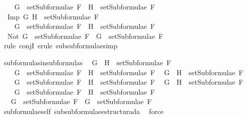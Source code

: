 \begin{isabellebody}
\ \ \ {\isasymLongrightarrow}\ G\ {\isasymin}\ setSubformulae\ F\ {\isasymand}\ H\ {\isasymin}\ setSubformulae\ F{\isachardoublequoteclose}\isanewline
\ \ {\isachardoublequoteopen}Imp\ G\ H\ {\isasymin}\ setSubformulae\ F\ \isanewline
\ \ \ {\isasymLongrightarrow}\ G\ {\isasymin}\ setSubformulae\ F\ {\isasymand}\ H\ {\isasymin}\ setSubformulae\ F{\isachardoublequoteclose}\isanewline
\ \ {\isachardoublequoteopen}Not\ G\ {\isasymin}\ setSubformulae\ F\ {\isasymLongrightarrow}\ G\ {\isasymin}\ setSubformulae\ F{\isachardoublequoteclose}\isanewline
%
\isadelimproof
\ \ %
\endisadelimproof
%
\isatagproof
{}\isamarkupfalse%
\ {\isacharparenleft}{\isacharparenleft}rule\ conjI{\isacharparenright}{\isacharplus}{\isacharcomma}\ {\isacharparenleft}erule\ subsubformulae{\isacharcomma}simp{\isacharparenright}{\isacharplus}{\isacharparenright}{\isacharplus}\isanewline
\ \ \isamarkupfalse%
%
\endisatagproof
{\isafoldproof}%
%
\isadelimproof
%
\endisadelimproof
%
\begin{isamarkuptext}%
%
\end{isamarkuptext}\isamarkuptrue%
\isamarkupfalse%
\ subformulas{\isacharunderscore}in{\isacharunderscore}subformulas{\isacharcolon}\isanewline
\ \ {\isachardoublequoteopen}G\ \isactrlbold {\isasymand}\ H\ {\isasymin}\ setSubformulae\ F\ \isanewline
\ \ \ {\isasymLongrightarrow}\ G\ {\isasymin}\ setSubformulae\ F\ {\isasymand}\ H\ {\isasymin}\ setSubformulae\ F{\isachardoublequoteclose}\isanewline
\ \ {\isachardoublequoteopen}G\ \isactrlbold {\isasymor}\ H\ {\isasymin}\ setSubformulae\ F\ \isanewline
\ \ \ {\isasymLongrightarrow}\ G\ {\isasymin}\ setSubformulae\ F\ {\isasymand}\ H\ {\isasymin}\ setSubformulae\ F{\isachardoublequoteclose}\isanewline
\ \ {\isachardoublequoteopen}G\ \isactrlbold {\isasymrightarrow}\ H\ {\isasymin}\ setSubformulae\ F\ \isanewline
\ \ \ {\isasymLongrightarrow}\ G\ {\isasymin}\ setSubformulae\ F\ {\isasymand}\ H\ {\isasymin}\ setSubformulae\ F{\isachardoublequoteclose}\isanewline
\ \ {\isachardoublequoteopen}\isactrlbold {\isasymnot}\ G\ {\isasymin}\ setSubformulae\ F\ {\isasymLongrightarrow}\ G\ {\isasymin}\ setSubformulae\ F{\isachardoublequoteclose}\isanewline
%
\isadelimproof
\ \ %
\endisadelimproof
%
\isatagproof
{}\isamarkupfalse%
\ subformulae{\isacharunderscore}self\ subsubformulae{\isacharunderscore}estructurada\ \isamarkupfalse%
\ force\isanewline
\ \ \isamarkupfalse%
%
\endisatagproof
{\isafoldproof}%
%
\isadelimproof
%
\endisadelimproof

\end{isabellebody}
